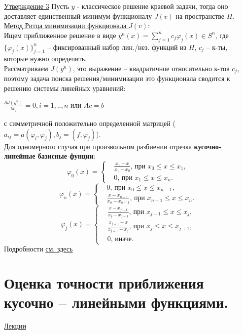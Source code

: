 \documentclass[specialist, subf, href, colorlinks=true, 12pt, times, mtpro, final]{disser}
\theoremstyle{definition}
\begin{document}
{    \hyperlink {lects.99}{Утверждение 3} Пусть $y$ - классическое решение краевой задачи, тогда оно доставляет единственный минимум функционалу $J(v)$ на пространстве $H$.\\
    \hyperlink {lects.99}{Метод Ритца минимизации функционала $J(v)$}:\\
    Ищем приближенное решение в виде $y^n(x) = \sum\limits^n_{j=1}c_j\varphi_j(x) \in S^n$, где $\{\varphi_j(x)\}^n_{j=1}$ \--- фиксированный набор лин./нез. функций из $H$, $c_j$ \--- к-ты, которые нужно определить.\\
    Рассматриваем $J(y^n)$,  это выражение \--- квадратичное относительно к-тов $c_j$, поэтому задача поиска решения/минимизации это функционала сводится к решению системы линейных уравнений:
    \begin{center}
    $\frac{\partial J(y^n)}{\partial c_i} = 0, i=1,..,n$ или $Ac=b$
    \end{center}
    с симметричной положительно определенной матрицей ($a_{ij} = a(\varphi_i,\varphi_j), b_j = (f, \varphi_j)$).\\
    Для одномерного случая при произвольном разбиении отрезка \textbf {кусочно-линейные базисные фунции}:
    $$
        \varphi_0(x) = 
        \left\{
        \begin{aligned}
            & \frac{x_1 - x}{x_1 - x_0} \text{, при } x_0 \le x \le x_1,\\
            & 0 \text{, при } x_1 \le x \le x_n.
        \end{aligned}
        \right.
    $$
    $$
        \varphi_n(x) = 
        \left\{
        \begin{aligned}
            & 0 \text{, при } x_0 \le x \le x_{n-1},\\
            & \frac{x - x_{n-1}}{x_n - x_{n-1}} \text{, при } x_{n-1} \le x \le x_n.
        \end{aligned}
        \right.
    $$
    $$
        \varphi_j(x) = 
        \left\{
        \begin{aligned}
            & \frac{x - x_{j-1}}{x_j - x_{j-1}} \text{, при } x_{j-1} \le x \le x_{j},\\
            & \frac{x_{j+1} - x}{x_{j+1} - x_j} \text{, при } x_j \le x \le x_{j+1},\\
            & 0 \text{, иначе.}
        \end{aligned}
        \right.
    $$
    Подробности \hyperlink {lects.100}{см. здесь}

\section {Оценка точности приближения кусочно -- линейными функциями.}
    \hyperlink {lects.102}{Лекции}\\
    
}
\end{document}
